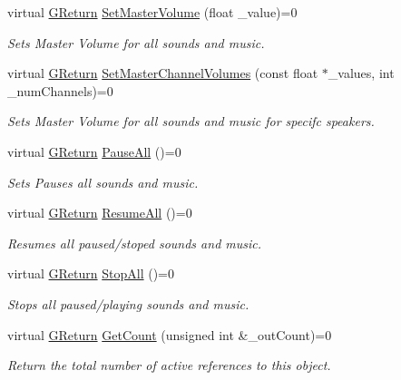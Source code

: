 \begin{DoxyCompactItemize}
virtual \mbox{\hyperlink{namespaceGW_a67a839e3df7ea8a5c5686613a7a3de21}{G\+Return}} \mbox{\hyperlink{classGW_1_1AUDIO_1_1GAudio_a34fb1be1551ce0e73bdb439e8d7ffcfa}{Set\+Master\+Volume}} (float \+\_\+value)=0
\begin{DoxyCompactList}\small\item\em Sets Master Volume for all sounds and music. \end{DoxyCompactList}\item 
virtual \mbox{\hyperlink{namespaceGW_a67a839e3df7ea8a5c5686613a7a3de21}{G\+Return}} \mbox{\hyperlink{classGW_1_1AUDIO_1_1GAudio_a51217fba0337b4e67bf43f77ba69a074}{Set\+Master\+Channel\+Volumes}} (const float $\ast$\+\_\+values, int \+\_\+num\+Channels)=0
\begin{DoxyCompactList}\small\item\em Sets Master Volume for all sounds and music for specifc speakers. \end{DoxyCompactList}\item 
virtual \mbox{\hyperlink{namespaceGW_a67a839e3df7ea8a5c5686613a7a3de21}{G\+Return}} \mbox{\hyperlink{classGW_1_1AUDIO_1_1GAudio_a1192a2665c74ea67f4ea52d95d444cef}{Pause\+All}} ()=0
\begin{DoxyCompactList}\small\item\em Sets Pauses all sounds and music. \end{DoxyCompactList}\item 
virtual \mbox{\hyperlink{namespaceGW_a67a839e3df7ea8a5c5686613a7a3de21}{G\+Return}} \mbox{\hyperlink{classGW_1_1AUDIO_1_1GAudio_a230edcaf3c03919d3ba86fdc16b1893f}{Resume\+All}} ()=0
\begin{DoxyCompactList}\small\item\em Resumes all paused/stoped sounds and music. \end{DoxyCompactList}\item 
virtual \mbox{\hyperlink{namespaceGW_a67a839e3df7ea8a5c5686613a7a3de21}{G\+Return}} \mbox{\hyperlink{classGW_1_1AUDIO_1_1GAudio_aa2571a54d993e8f3f47a32bdf31f6e60}{Stop\+All}} ()=0
\begin{DoxyCompactList}\small\item\em Stops all paused/playing sounds and music. \end{DoxyCompactList}\item 
virtual \mbox{\hyperlink{namespaceGW_a67a839e3df7ea8a5c5686613a7a3de21}{G\+Return}} \mbox{\hyperlink{classGW_1_1AUDIO_1_1GAudio_a079dfab7b9db1536b10c9d2afa20c89c}{Get\+Count}} (unsigned int \&\+\_\+out\+Count)=0
\begin{DoxyCompactList}\small\item\em Return the total number of active references to this object. \end{DoxyCompactList}\item 

\end{DoxyCompactItemize}
